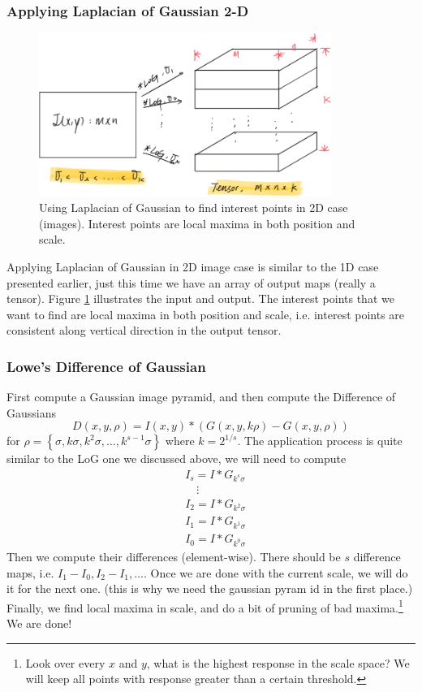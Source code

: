 \documentclass[11pt]{article}
\begin{document}
\subsubsection{Applying Laplacian of Gaussian 2-D}
\begin{figure}[H]
	\center\includegraphics[width=0.85\textwidth]{figs/2d_log}
	\caption{Using Laplacian of Gaussian to find interest points in 2D case (images). Interest points are local maxima in both position and scale. \label{fig:2d_log}}
\end{figure}
Applying Laplacian of Gaussian in 2D image case is similar to the 1D case presented earlier, just this time we have an array of output maps (really a tensor). Figure \ref{fig:2d_log} illustrates the input and output. The interest points that we want to find are local maxima in both position and scale, i.e. interest points are consistent along vertical direction in the output tensor. 

\subsubsection{Lowe's Difference of Gaussian}
First compute a Gaussian image pyramid, and then compute the Difference of Gaussians
\begin{equation}
	D(x, y, \rho)=I(x, y) *(G(x, y, k \rho)-G(x, y, \rho))
\end{equation}
for $\rho=\left\{\sigma, k \sigma, k^{2} \sigma, \ldots, k^{s-1} \sigma\right\}$ where $k = 2^{1/s}$. The application process is quite similar to the LoG one we discussed above, we will need to compute
\begin{align}
	&I_s = I * G_{k^s \sigma} \\
	&\quad \vdots \\
	&I_2 = I * G_{k^2\sigma} \\
	&I_1 = I * G_{k^1\sigma} \\
	&I_0 = I * G_{k^0\sigma}
\end{align}
Then we compute their differences (element-wise). There should be $s$ difference maps, i.e. $I_1 - I_0, I_2 - I_1, ...$. Once we are done with the current scale, we will do it for the next one. (this is why we need the gaussian pyram id in the first place.) Finally, we find local maxima in scale, and do a bit of pruning of bad maxima.\footnote{Look over every $x$ and $y$, what is the highest response in the scale space? We will keep all points with response greater than a certain threshold. } We are done! 
\end{document}
